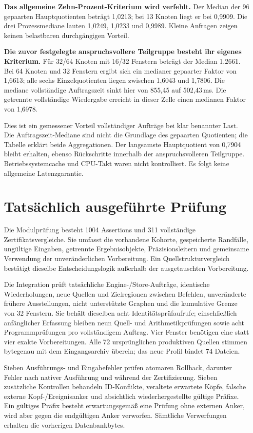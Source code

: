 \documentclass[11pt,a4paper]{article}
\begin{document}
\textbf{Das allgemeine Zehn-Prozent-Kriterium wird verfehlt.} Der Median der 96 gepaarten Hauptquotienten beträgt 1,0213; bei 13 Knoten liegt er bei 0,9909. Die drei Prozessmediane lauten 1,0249, 1,0233 und 0,9989. Kleine Anfragen zeigen keinen belastbaren durchgängigen Vorteil.

\textbf{Die zuvor festgelegte anspruchsvollere Teilgruppe besteht ihr eigenes Kriterium.} Für 32/64 Knoten mit 16/32 Fenstern beträgt der Median 1,2661. Bei 64 Knoten und 32 Fenstern ergibt sich ein medianer gepaarter Faktor von 1,6613; alle sechs Einzelquotienten liegen zwischen 1,6043 und 1,7806. Die mediane vollständige Auftragszeit sinkt hier von 855,45 auf 502,43\,ms. Die getrennte vollständige Wiedergabe erreicht in dieser Zelle einen medianen Faktor von 1,6978.

Dies ist ein gemessener Vorteil vollständiger Aufträge bei klar benannter Last. Die Auftragszeit-Mediane sind nicht die Grundlage des gepaarten Quotienten; die Tabelle erklärt beide Aggregationen. Der langsamste Hauptquotient von 0,7904 bleibt erhalten, ebenso Rückschritte innerhalb der anspruchsvolleren Teilgruppe. Betriebssystemcache und CPU-Takt waren nicht kontrolliert. Es folgt keine allgemeine Latenzgarantie.

\newpage
\section*{Tatsächlich ausgeführte Prüfung}
Die Modulprüfung besteht 1004 Assertions und 311 vollständige Zertifikatsvergleiche. Sie umfasst die vorhandene Kohorte, gespeicherte Randfälle, ungültige Eingaben, getrennte Ergebnisobjekte, Präzisionsleitern und gemeinsame Verwendung der unveränderlichen Vorbereitung. Ein Quellstrukturvergleich bestätigt dieselbe Entscheidungslogik außerhalb der ausgetauschten Vorbereitung.

Die Integration prüft tatsächliche Engine-/Store-Aufträge, identische Wiederholungen, neue Quellen und Zielregionen zwischen Befehlen, unveränderte frühere Ausstellungen, nicht unterstützte Graphen und die kumulative Grenze von 32 Fenstern. Sie behält dieselben acht Identitätsprüfaufrufe; einschließlich anfänglicher Erfassung bleiben neun Quell- und Arithmetikprüfungen sowie acht Programmprüfungen pro vollständigem Auftrag. Vier Fenster benötigen eine statt vier exakte Vorbereitungen. Alle 72 ursprünglichen produktiven Quellen stimmen bytegenau mit dem Eingangsarchiv überein; das neue Profil bindet 74 Dateien.

Sieben Ausführungs- und Eingabefehler prüfen atomaren Rollback, darunter Fehler nach nativer Ausführung und während der Zertifizierung. Sieben zusätzliche Kontrollen behandeln ID-Konflikte, veraltete erwartete Köpfe, falsche externe Kopf-/Ereignisanker und absichtlich wiederhergestellte gültige Präfixe. Ein gültiges Präfix besteht erwartungsgemäß eine Prüfung ohne externen Anker, wird aber gegen die endgültigen Anker verworfen. Sämtliche Verwerfungen erhalten die vorherigen Datenbankbytes.
\end{document}
